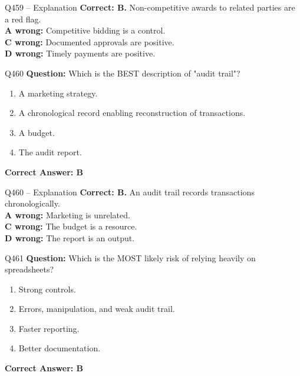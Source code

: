 \documentclass[aspectratio=169,10pt]{beamer}
\begin{document}
	\begin{frame}[t]{Q459 -- Explanation}
		\small
		\textbf{Correct: B.} Non-competitive awards to related parties are a red flag. \\[4pt]
		\textbf{A wrong:} Competitive bidding is a control. \\[2pt]
		\textbf{C wrong:} Documented approvals are positive. \\[2pt]
		\textbf{D wrong:} Timely payments are positive.
	\end{frame}
	
	\begin{frame}[t]{Q460}
		\small
		\textbf{Question:} Which is the BEST description of "audit trail"?
		\begin{enumerate}[label=\Alph*.,itemsep=1pt,topsep=2pt]
			\item A marketing strategy.
			\item A chronological record enabling reconstruction of transactions.
			\item A budget.
			\item The audit report.
		\end{enumerate}
		\vspace{4pt}
		\textbf{Correct Answer: B}
	\end{frame}
	
	\begin{frame}[t]{Q460 -- Explanation}
		\small
		\textbf{Correct: B.} An audit trail records transactions chronologically. \\[4pt]
		\textbf{A wrong:} Marketing is unrelated. \\[2pt]
		\textbf{C wrong:} The budget is a resource. \\[2pt]
		\textbf{D wrong:} The report is an output.
	\end{frame}
	
	\begin{frame}[t]{Q461}
		\small
		\textbf{Question:} Which is the MOST likely risk of relying heavily on spreadsheets?
		\begin{enumerate}[label=\Alph*.,itemsep=1pt,topsep=2pt]
			\item Strong controls.
			\item Errors, manipulation, and weak audit trail.
			\item Faster reporting.
			\item Better documentation.
		\end{enumerate}
		\vspace{4pt}
		\textbf{Correct Answer: B}
	\end{frame}
	
\end{document}
